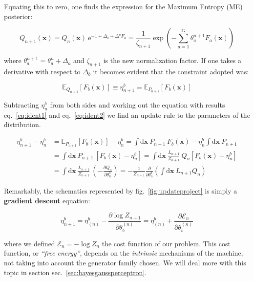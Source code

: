 \documentclass[12pt,a4paperpaper,]{tufte-book}
\begin{document}
Equating this to zero, one finds the expression for the Maximum Entropy (ME) posterior:

\[Q_{n+1}(\mathbf{x}) = Q_n(\mathbf{x})\ \mathrm{e}^{-1 + \Delta_0 + \Delta^a F_a} = \frac{1}{\zeta_{n+1}} \exp\left(- \sum_{a=1}^G \theta_a^{n+1} F_a(\mathbf{x}) \right)\]

where \(\theta^{n+1}_a = \theta^n_a + \Delta_a\) and \(\zeta_{n+1}\) is the new normalization factor. If one takes a derivative with respect to \(\Delta_b\) it becomes evident that the constraint adopted was:

\[\mathbb{E}_{Q_{n+1}}[F_b(\mathbf{x})] \equiv \eta^b_{n+1} = \mathbb{E}_{P_{n+1}}[F_b(\mathbf{x})]\]

Subtracting \(\eta^b_n\) from both sides and working out the equation with results eq.~\ref{eq:ident1} and eq.~\ref{eq:ident2} we find an update rule to the parameters of the distribution.

\begin{align}
  \eta^b_{n+1} - \eta^b_n &= \mathbb{E}_{P_{n+1}}[F_b(\mathbf{x})] - \eta^b_n =  \int \mathrm{d}\mathbf{x}\ P_{n+1}\ F_b(\mathbf{x}) -  \eta^b_n \int \mathrm{d}\mathbf{x}\ P_{n+1} \\
  &= \int \mathrm{d}\mathbf{x}\ P_{n+1}\ [F_b(\mathbf{x}) -  \eta^b_n] = \int \mathrm{d}\mathbf{x}\ \frac{L_{n+1}}{Z_{n+1}}\ Q_n [F_b(\mathbf{x}) -  \eta^b_n] \\
  &=  \int \mathrm{d}\mathbf{x}\ \frac{L_{n+1}}{Z_{n+1}}\ \left( - \frac{\partial Q_n}{\partial \theta^b_n} \right) = - \frac{1}{Z_{n+1}} \frac{\partial}{\partial \theta^b_n} \left( \int \mathrm{d}\mathbf{x}\ L_{n+1} Q_n \right)
\end{align}

Remarkably, the schematics represented by fig.~\ref{fig:updateproject} is simply a \textbf{gradient descent} equation:

\begin{equation} \eta^b_{n+1} = \eta^b_{(n)} - \frac{\partial \log Z_{n+1}}{\partial \theta_b^{(n)}} = \eta^b_{(n)} + \frac{\partial \mathcal{E}_n}{\partial \theta_b^{(n)}} \label{eq:gradientdescent}\end{equation}

where we defined \(\mathcal{E}_n = - \log Z_n\) the cost function of our problem. This cost function, or \emph{``free energy''}, depends on the \emph{intrinsic} mechanisms of the machine, not taking into account the generator family chosen. We will deal more with this topic in section sec.~\ref{sec:bayesgaussperceptron}.
\end{document}

